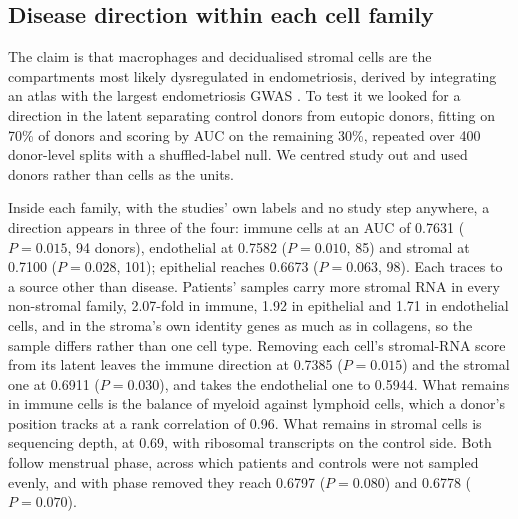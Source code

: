 \begin{table}[t]
\centering
\caption[Composition against severity]{\textbf{Cell-family composition does
not track surgical severity.} Patients only, 51 donors with at least 200
cells; low severity is mild or rASRM stage I--II and high is severe or
stage III--IV. Shares are over the transferred and annotated family labels;
the means are raw donor shares. $F$ is for the severity term over a model
with study alone, fitted to the log-odds of each donor's share, and
\textit{P} is from 5{,}000 reassignments of severity among donors within
study.}
\label{stab:severity-composition}
\small

\end{table}

\subsection{Disease direction within each cell family}

The claim is that macrophages and decidualised stromal cells are the
compartments most likely dysregulated in endometriosis, derived by
integrating an atlas with the largest endometriosis GWAS
\citep{mareckova2024heca}. To test it we looked for a direction in the
latent separating control donors from eutopic donors, fitting on 70\% of
donors and scoring by AUC on the remaining 30\%, repeated over 400
donor-level splits with a shuffled-label null. We centred study out and
used donors rather than cells as the units.

Inside each family, with the studies' own labels and no study step
anywhere, a direction appears in three of the four: immune cells at an AUC
of 0.7631 ($P = 0.015$, 94 donors), endothelial at 0.7582 ($P = 0.010$, 85)
and stromal at 0.7100 ($P = 0.028$, 101); epithelial reaches 0.6673
($P = 0.063$, 98). Each traces to a source other than disease. Patients'
samples carry more stromal RNA in every non-stromal family, 2.07-fold in
immune, 1.92 in epithelial and 1.71 in endothelial cells, and in the
stroma's own identity genes as much as in collagens, so the sample differs
rather than one cell type. Removing each cell's stromal-RNA score from its
latent leaves the immune direction at 0.7385 ($P = 0.015$) and the stromal
one at 0.6911 ($P = 0.030$), and takes the endothelial one to 0.5944. What
remains in immune cells is the balance of myeloid against lymphoid cells,
which a donor's position tracks at a rank correlation of 0.96. What remains
in stromal cells is sequencing depth, at 0.69, with ribosomal transcripts
on the control side. Both follow menstrual phase, across which patients and
controls were not sampled evenly, and with phase removed they reach 0.6797
($P = 0.080$) and 0.6778 ($P = 0.070$).

